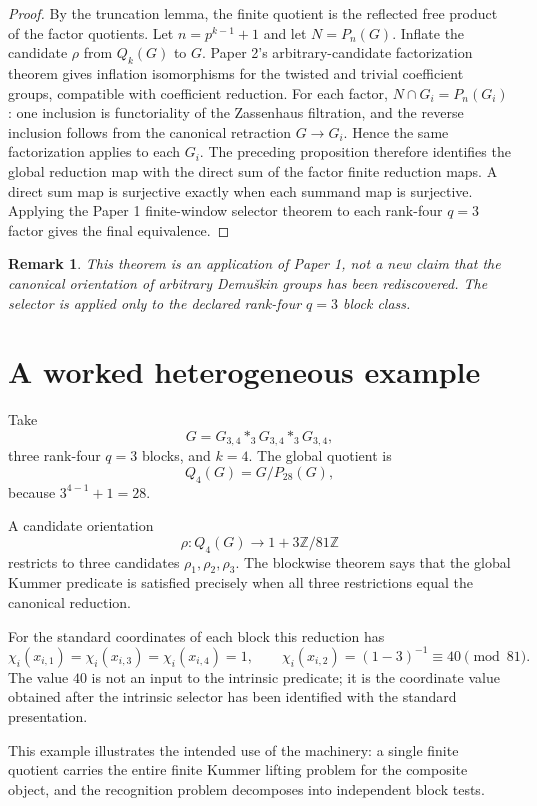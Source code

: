 \documentclass[11pt]{article}
\newtheorem{remark}[theorem]{Remark}
\begin{document}
\begin{proof}
By the truncation lemma, the finite quotient is the reflected free product of the factor quotients. Let $n=p^{k-1}+1$ and let $N=P_n(G)$. Inflate the candidate $\rho$ from $Q_k(G)$ to $G$. Paper 2's arbitrary-candidate factorization theorem gives inflation isomorphisms for the twisted and trivial coefficient groups, compatible with coefficient reduction. For each factor, $N\cap G_i=P_n(G_i)$: one inclusion is functoriality of the Zassenhaus filtration, and the reverse inclusion follows from the canonical retraction $G\to G_i$. Hence the same factorization applies to each $G_i$. The preceding proposition therefore identifies the global reduction map with the direct sum of the factor finite reduction maps. A direct sum map is surjective exactly when each summand map is surjective. Applying the Paper 1 finite-window selector theorem to each rank-four $q=3$ factor gives the final equivalence.
\end{proof}

\begin{remark}
This theorem is an application of Paper 1, not a new claim that the canonical orientation of arbitrary Demuškin groups has been rediscovered. The selector is applied only to the declared rank-four $q=3$ block class.
\end{remark}

\section{A worked heterogeneous example}

Take
\[
G=G_{3,4}*_3G_{3,4}*_3G_{3,4},
\]
three rank-four $q=3$ blocks, and $k=4$. The global quotient is
\[
Q_4(G)=G/P_{28}(G),
\]
because $3^{4-1}+1=28$.

A candidate orientation
\[
\rho:Q_4(G)\to1+3\mathbb Z/81\mathbb Z
\]
restricts to three candidates $\rho_1,\rho_2,\rho_3$. The blockwise theorem says that the global Kummer predicate is satisfied precisely when all three restrictions equal the canonical reduction.

For the standard coordinates of each block this reduction has
\[
\chi_i(x_{i,1})=\chi_i(x_{i,3})=\chi_i(x_{i,4})=1,
\qquad
\chi_i(x_{i,2})=(1-3)^{-1}\equiv40\pmod{81}.
\]
The value $40$ is not an input to the intrinsic predicate; it is the coordinate value obtained after the intrinsic selector has been identified with the standard presentation.

This example illustrates the intended use of the machinery: a single finite quotient carries the entire finite Kummer lifting problem for the composite object, and the recognition problem decomposes into independent block tests.
\end{document}
